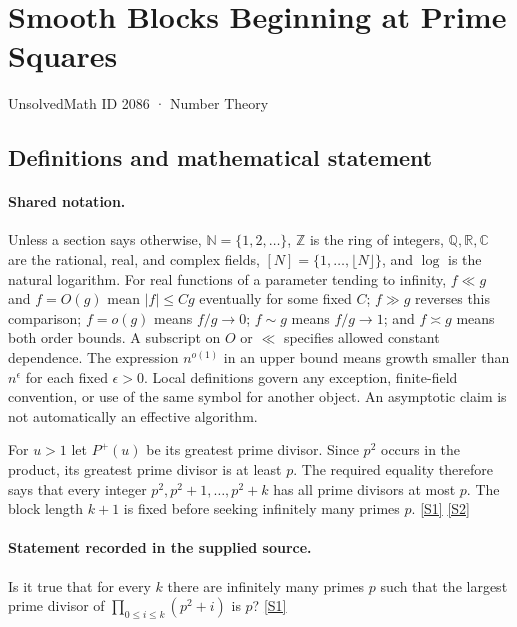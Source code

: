 \documentclass[11pt,a4paper]{article}
\newcommand{\N}{\mathbb{N}}
\newcommand{\Z}{\mathbb{Z}}
\newcommand{\Q}{\mathbb{Q}}
\newcommand{\R}{\mathbb{R}}
\newcommand{\C}{\mathbb{C}}
\newcommand{\sref}[2]{\hyperlink{source:#1:#2}{[S#2]}}
\begin{document}

\setcounter{section}{2085}

\section{Smooth Blocks Beginning at Prime Squares}\label{2086}

{\small\sffamily UnsolvedMath ID 2086 · Number Theory}

\subsection{Definitions and mathematical statement}

\paragraph{Shared notation.}Unless a section says otherwise, $\N=\{1,2,\ldots\}$,
$\Z$ is the ring of integers, $\Q,\R,\C$ are the rational, real, and complex
fields, $[N]=\{1,\ldots,\lfloor N\rfloor\}$, and $\log$ is the natural
logarithm. For real functions of a parameter tending to infinity,
$f\ll g$ and $f=O(g)$ mean $|f|\leq Cg$ eventually for some fixed $C$;
$f\gg g$ reverses this comparison; $f=o(g)$ means $f/g\to0$;
$f\sim g$ means $f/g\to1$; and $f\asymp g$ means both order bounds.
A subscript on $O$ or $\ll$ specifies allowed constant dependence.
The expression $n^{o(1)}$ in an upper bound means growth smaller than
$n^\epsilon$ for each fixed $\epsilon>0$. Local definitions govern any
exception, finite-field convention, or use of the same symbol for another
object. An asymptotic claim is not automatically an effective algorithm.



For $u>1$ let $P^+(u)$ be its greatest prime divisor. Since $p^2$ occurs in the product, its greatest prime divisor is at least $p$. The required equality therefore says that every integer $p^2,p^2+1,\ldots,p^2+k$ has all prime divisors at most $p$. The block length $k+1$ is fixed before seeking infinitely many primes $p$. \sref{2086}{1} \sref{2086}{2}

\paragraph{Statement recorded in the supplied source.}
Is it true that for every $k$ there are infinitely many primes $p$ such that the largest prime divisor of $ \prod_{0\leq i\leq k}(p^2+i) $ is $p$? \sref{2086}{1}
\end{document}
